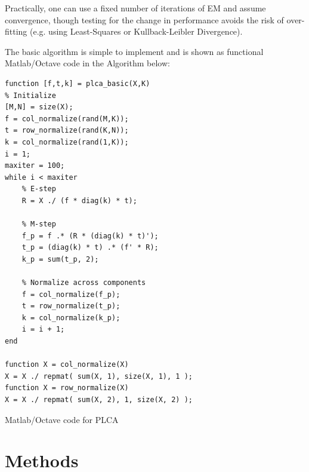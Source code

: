 Practically, one can use a fixed number of iterations of EM and assume convergence, though testing for the change in performance avoids the risk of over-fitting \cite{Hofmann1999} (e.g. using Least-Squares or Kullback-Leibler Divergence).   

The basic algorithm is simple to implement and is shown as functional Matlab/Octave code in the Algorithm below: 


\begin{program}
  \begin{verbatim}
function [f,t,k] = plca_basic(X,K)
% Initialize
[M,N] = size(X);
f = col_normalize(rand(M,K));
t = row_normalize(rand(K,N));
k = col_normalize(rand(1,K));
i = 1;
maxiter = 100;
while i < maxiter
    % E-step
    R = X ./ (f * diag(k) * t);
    
    % M-step
    f_p = f .* (R * (diag(k) * t)');
    t_p = (diag(k) * t) .* (f' * R);
    k_p = sum(t_p, 2);
    
    % Normalize across components
    f = col_normalize(f_p);
    t = row_normalize(t_p);
    k = col_normalize(k_p);
    i = i + 1;
end

function X = col_normalize(X)
X = X ./ repmat( sum(X, 1), size(X, 1), 1 );
function X = row_normalize(X)
X = X ./ repmat( sum(X, 2), 1, size(X, 2) );
\end{verbatim}
  \caption{Matlab/Octave code for PLCA}
\end{program}




\section{Methods}

